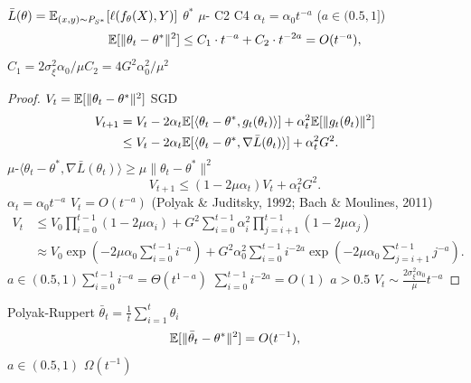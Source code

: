 \section{}\label{sec:rates}

\subsection{}

\begin{theorem}[]\label{thm:rate-student}
 $\bar{L}(\theta) = \mathbb{E}_{(x,y) \sim P_{S^*}}[\ell(f_\theta(X), Y)]$  $\theta^*$  $\mu$- C2  C4  $\alpha_t = \alpha_0 t^{-a}$ ($a \in (0.5, 1]$)
\begin{equation}
    \mathbb{E}[\|\theta_t - \theta^*\|^2] \leq C_1 \cdot t^{-a} + C_2 \cdot t^{-2a} = O(t^{-a}),
\end{equation}
 $C_1 = 2\sigma_\xi^2 \alpha_0 / \mu$$C_2 = 4 G^2 \alpha_0^2 / \mu^2$
\end{theorem}

\begin{proof}
 $V_t = \mathbb{E}[\|\theta_t - \theta^*\|^2]$ SGD 
\begin{align}
    V_{t+1} &= V_t - 2\alpha_t \mathbb{E}[\langle \theta_t - \theta^*, g_t(\theta_t) \rangle] + \alpha_t^2 \mathbb{E}[\|g_t(\theta_t)\|^2] \\
    &\leq V_t - 2\alpha_t \mathbb{E}[\langle \theta_t - \theta^*, \nabla \bar{L}(\theta_t) \rangle] + \alpha_t^2 G^2.
\end{align}
 $\mu$-$\langle \theta_t - \theta^*, \nabla \bar{L}(\theta_t) \rangle \geq \mu \|\theta_t - \theta^*\|^2$
\begin{equation}
    V_{t+1} \leq (1 - 2\mu\alpha_t) V_t + \alpha_t^2 G^2.
\end{equation}
 $\alpha_t = \alpha_0 t^{-a}$ $V_t = O(t^{-a})$ (Polyak \& Juditsky, 1992; Bach \& Moulines, 2011)
\begin{align}
    V_t &\leq V_0 \prod_{i=0}^{t-1} (1 - 2\mu\alpha_i) + G^2 \sum_{i=0}^{t-1} \alpha_i^2 \prod_{j=i+1}^{t-1} (1 - 2\mu\alpha_j) \\
    &\approx V_0 \exp\left(-2\mu \alpha_0 \sum_{i=0}^{t-1} i^{-a}\right) + G^2 \alpha_0^2 \sum_{i=0}^{t-1} i^{-2a} \exp\left(-2\mu \alpha_0 \sum_{j=i+1}^{t-1} j^{-a}\right).
\end{align}
 $a \in (0.5, 1)$$\sum_{i=0}^{t-1} i^{-a} = \Theta(t^{1-a})$ $\sum_{i=0}^{t-1} i^{-2a} = O(1)$ $a > 0.5$ $V_t \sim \frac{2\sigma_\xi^2 \alpha_0}{\mu} t^{-a}$
\end{proof}

\begin{corollary}\label{cor:polyak}
 Polyak-Ruppert  $\bar{\theta}_t = \frac{1}{t}\sum_{i=1}^t \theta_i$
\begin{equation}
    \mathbb{E}[\|\bar{\theta}_t - \theta^*\|^2] = O(t^{-1}),
\end{equation}
\textbf{} $a \in (0.5, 1)$ $\Omega(t^{-1})$ 
\end{corollary}

